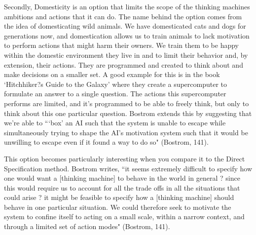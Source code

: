 \documentclass[11pt, oneside]{article}
\begin{document}
\par 
Secondly, Domesticity is an option that limits the scope of the thinking machines ambitions and actions that it can do. The name behind the option comes from the idea of domesticating wild animals. We have domesticated cats and dogs for generations now, and domestication allows us to train animals to lack motivation to perform actions that might harm their owners. We train them to be happy within the domestic environment they live in and to limit their behavior and, by extension, their actions. They are programmed and created to think about and make decisions on a smaller set. 
A good example for this is in the book `Hitchhiker?s Guide to the Galaxy' where they create a supercomputer to formulate an answer to a single question. The actions this supercomputer performs are limited, and it's programmed to be able to freely think, but only to think about this one particular question. Bostrom extends this by suggesting that we're able to ```box' an AI such that the system is unable to escape while simultaneously trying to shape the AI's motivation system such that it would be unwilling to escape even if it found a way to do so" (Bostrom, 141).
\par 
This option becomes particularly interesting when you compare it to the Direct Specification method. Bostrom writes, ``it seems extremely difficult to specify how one would want a [thinking machine] to behave in the world in general ? since this would require us to account for all the trade offs in all the situations that could arise ? it might be feasible to specify how a [thinking machine] should behave in one particular situation. We could therefore seek to motivate the system to confine itself to acting on a small scale, within a narrow context, and through a limited set of action modes" (Bostrom, 141).
\end{document}
